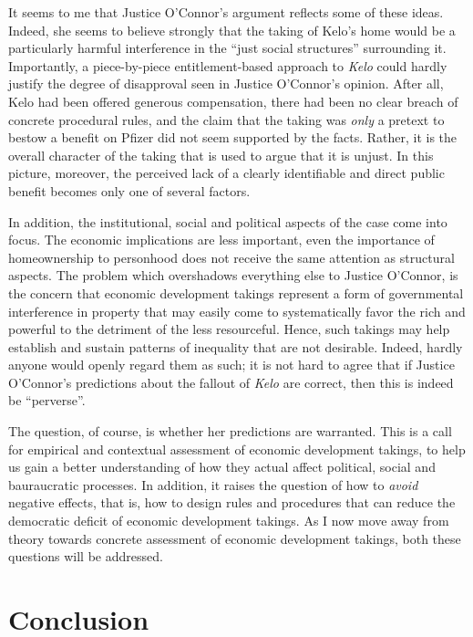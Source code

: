 It seems to me that Justice O'Connor's argument reflects some of these ideas. Indeed, she seems to believe strongly that the taking of Kelo's home would be a particularly harmful interference in the ``just social structures'' surrounding it. Importantly, a piece-by-piece entitlement-based approach to {\it Kelo} could hardly justify the degree of disapproval seen in Justice O'Connor's opinion. After all, Kelo had been offered generous compensation, there had been no clear breach of concrete procedural rules, and the claim that the taking was {\it only} a pretext to bestow a benefit on Pfizer did not seem supported by the facts. Rather, it is the overall character of the taking that is used to argue that it is unjust. In this picture, moreover, the perceived lack of a clearly identifiable and direct public benefit becomes only one of several factors.

In addition, the institutional, social and political aspects of the case come into focus. The economic implications are less important, even the importance of homeownership to personhood does not receive the same attention as structural aspects. The problem which overshadows everything else to Justice O'Connor, is the concern that economic development takings represent a form of governmental interference in property that may easily come to systematically favor the rich and powerful to the detriment of the less resourceful. Hence, such takings may help establish and sustain patterns of inequality that are not desirable. Indeed, hardly anyone would openly regard them as such; it is not hard to agree that if Justice O'Connor's predictions about the fallout of {\it Kelo} are correct, then this is indeed be ``perverse''. 

The question, of course, is whether her predictions are warranted. This is a call for empirical and contextual assessment of economic development takings, to help us gain a better understanding of how they actual affect political, social and bauraucratic processes. In addition, it raises the question of how to {\it avoid} negative effects, that is, how to design rules and procedures that can reduce the democratic deficit of economic development takings. As I now move away from theory towards concrete assessment of economic development takings, both these questions will be addressed. 

\section{Conclusion}

